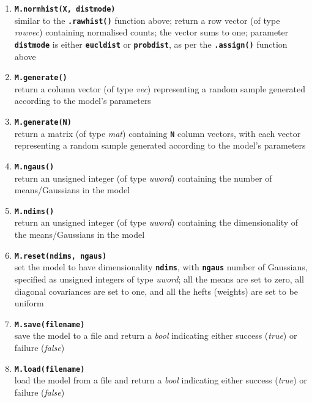 \documentclass[10pt,a4paper]{article}
\def\_{{\tt\char95}}
\begin{document}
\begin{small}
\begin{enumerate}[{$\bullet$}]
\item
{\tt\bfseries M.norm\_hist(X, dist\_mode)}\\
similar to the {\tt\bfseries .raw\_hist()} function above; return a row vector (of type {\it rowvec}) containing normalised counts; the vector sums to one;
parameter {\tt\bfseries dist\_mode} is either {\tt\bfseries eucl\_dist} or {\tt\bfseries prob\_dist}, as per the {\tt\bfseries .assign()} function above

\item
{\tt\bfseries M.generate()}\\
return a column vector (of type {\it vec}) representing a random sample generated according to the model's parameters

\item
{\tt\bfseries M.generate(N)}\\
return a matrix (of type {\it mat}) containing {\tt\bfseries N} column vectors, with each vector representing a random sample generated according to the model's parameters

\item
{\tt\bfseries M.n\_gaus()}\\
return an unsigned integer (of type {\it uword}) containing the number of means/Gaussians in the model

\item
{\tt\bfseries M.n\_dims()}\\
return an unsigned integer (of type {\it uword}) containing the dimensionality of the means/Gaussians in the model

\item
{\tt\bfseries M.reset(n\_dims, n\_gaus)}\\
set the model to have dimensionality {\tt\bfseries n\_dims}, with {\tt\bfseries n\_gaus} number of Gaussians, specified as unsigned integers of type {\it uword};
all the means are set to zero, all diagonal covariances are set to one, and all the hefts (weights) are set to be uniform

\item
{\tt\bfseries M.save(filename)}\\
save the model to a file and return a {\it bool} indicating either success ({\it true}) or failure ({\it false})

\item
{\tt\bfseries M.load(filename)}\\
load the model from a file and return a {\it bool} indicating either success ({\it true}) or failure ({\it false})


\end{enumerate}
\end{small}
\end{document}
